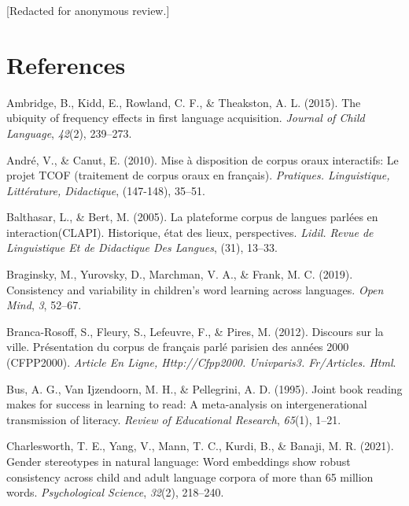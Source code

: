 \documentclass[10pt, letterpaper]{article}
\newenvironment{CSLReferences}%
  {}%
  {\par}
\begin{document}
{[}Redacted for anonymous review.{]}

\hypertarget{references}{%
\section{References}\label{references}}

\setlength{\parindent}{-0.1in} 
\setlength{\leftskip}{0.125in}

\noindent

\hypertarget{refs}{}
\begin{CSLReferences}{1}{0}
\leavevmode{}%
Ambridge, B., Kidd, E., Rowland, C. F., \& Theakston, A. L. (2015). The
ubiquity of frequency effects in first language acquisition.
\emph{Journal of Child Language}, \emph{42}(2), 239--273.

\leavevmode{}%
André, V., \& Canut, E. (2010). Mise {à} disposition de corpus oraux
interactifs: Le projet TCOF (traitement de corpus oraux en fran{ç}ais).
\emph{Pratiques. Linguistique, Litt{é}rature, Didactique}, (147-148),
35--51.

\leavevmode{}%
Balthasar, L., \& Bert, M. (2005). La plateforme corpus de langues
parl{é}es en interaction(CLAPI). Historique, {é}tat des lieux,
perspectives. \emph{Lidil. Revue de Linguistique Et de Didactique Des
Langues}, (31), 13--33.

\leavevmode{}%
Braginsky, M., Yurovsky, D., Marchman, V. A., \& Frank, M. C. (2019).
Consistency and variability in children's word learning across
languages. \emph{Open Mind}, \emph{3}, 52--67.

\leavevmode{}%
Branca-Rosoff, S., Fleury, S., Lefeuvre, F., \& Pires, M. (2012).
Discours sur la ville. Pr{é}sentation du corpus de fran{ç}ais parl{é}
parisien des ann{é}es 2000 (CFPP2000). \emph{Article En Ligne,
Http://Cfpp2000. Univparis3. Fr/Articles. Html}.

\leavevmode{}%
Bus, A. G., Van Ijzendoorn, M. H., \& Pellegrini, A. D. (1995). Joint
book reading makes for success in learning to read: A meta-analysis on
intergenerational transmission of literacy. \emph{Review of Educational
Research}, \emph{65}(1), 1--21.

\leavevmode{}%
Charlesworth, T. E., Yang, V., Mann, T. C., Kurdi, B., \& Banaji, M. R.
(2021). Gender stereotypes in natural language: Word embeddings show
robust consistency across child and adult language corpora of more than
65 million words. \emph{Psychological Science}, \emph{32}(2), 218--240.


\end{CSLReferences}
\end{document}
